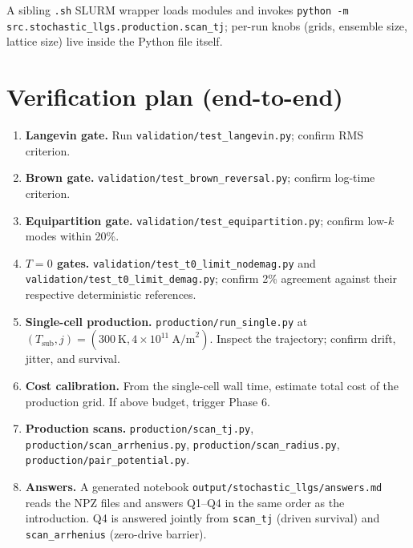 \documentclass[11pt,a4paper]{article}
\newcommand{\jcur}{j}
\begin{document}
A sibling \texttt{.sh} SLURM wrapper loads modules and invokes
\texttt{python -m src.stochastic\_llgs.production.scan\_tj}; per-run
knobs (grids, ensemble size, lattice size) live inside the Python
file itself.

\section{Verification plan (end-to-end)}

\begin{enumerate}[leftmargin=2em]
    \item \textbf{Langevin gate.} Run
    \texttt{validation/test\_langevin.py}; confirm RMS criterion.
    \item \textbf{Brown gate.}
    \texttt{validation/test\_brown\_reversal.py};
    confirm log-time criterion.
    \item \textbf{Equipartition gate.}
    \texttt{validation/test\_equipartition.py};
    confirm low-$k$ modes within 20\%.
    \item \textbf{$T=0$ gates.}
    \texttt{validation/test\_t0\_limit\_nodemag.py} and
    \texttt{validation/test\_t0\_limit\_demag.py}; confirm 2\%
    agreement against their respective deterministic references.
    \item \textbf{Single-cell production.}
    \texttt{production/run\_single.py} at $(T_{\text{sub}}, \jcur) =
    (300~\text{K}, 4\times 10^{11}~\text{A/m}^2)$. Inspect the
    trajectory; confirm drift, jitter, and survival.
    \item \textbf{Cost calibration.} From the single-cell wall time,
    estimate total cost of the production grid. If above budget,
    trigger Phase 6.
    \item \textbf{Production scans.}
    \texttt{production/scan\_tj.py},
    \texttt{production/scan\_arrhenius.py},
    \texttt{production/scan\_radius.py},
    \texttt{production/pair\_potential.py}.
    \item \textbf{Answers.} A generated notebook
    \texttt{output/stochastic\_llgs/answers.md} reads the NPZ files
    and answers Q1--Q4 in the same order as the introduction.
    Q4 is answered jointly from \texttt{scan\_tj} (driven survival)
    and \texttt{scan\_arrhenius} (zero-drive barrier).
\end{enumerate}

\end{document}
